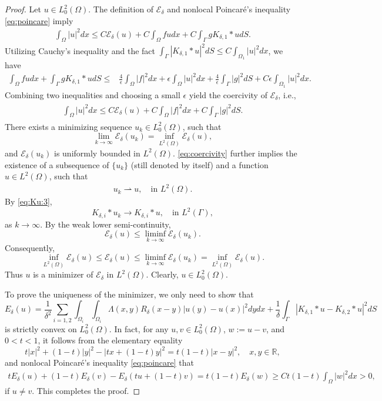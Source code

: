 \documentclass{article}
\newcommand{\R}{\mathbb{R}}
\theoremstyle{definition}
\begin{document}
\begin{proof}
  Let $u\in L^2_0(\Omega)$.
  The definition of $\mathcal{E}_\delta$ and nonlocal Poincar\'{e}'s inequality \eqref{eq:poincare} imply
  \begin{align*}
    \int_\Omega |u|^2dx
    \leq C\mathcal{E}_\delta(u)
    +C\int_{\Omega}fudx + C\int_\Gamma g K_{\delta,1}\ast u dS.
  \end{align*}
  Utilizing Cauchy's inequality and the fact
  $\int_\Gamma |K_{\delta,1}\ast u|^2dS\leq C\int_{\Omega_1}|u|^2dx$,
  we have
  \begin{align*}
  \int_{\Omega}fudx + \int_\Gamma gK_{\delta,1}\ast u dS
  \leq& \frac{4}{\epsilon}\int_\Omega |f|^2dx
  +\epsilon\int_\Omega |u|^2dx
  +\frac{4}{\epsilon}\int_\Gamma |g|^2dS
  +C\epsilon \int_{\Omega_1}|u|^2dx.
  \end{align*}
  Combining two inequalities and choosing a small $\epsilon$ yield the coercivity of $\mathcal{E}_\delta$, i.e.,
    \begin{align}\label{eq:coercivity}
  \begin{split}
    \int_\Omega|u|^2dx
    \leq C\mathcal{E}_\delta(u)+C\int_\Omega |f|^2dx + C\int_\Gamma |g|^2dS.
  \end{split}
  \end{align}
There exists a minimizing sequence $u_k\in L_0^2(\Omega)$, such that
\[
\lim_{k\rightarrow\infty}\mathcal{E}_\delta(u_k)=\inf_{L^2(\Omega)} \mathcal{E}_\delta(u),
\]
and $\mathcal{E}_\delta(u_k)$ is uniformly bounded in $L^2(\Omega)$.
\eqref{eq:coercivity} further implies the existence of a subsequence of $\{u_k\}$ (still denoted by itself) and a function $u\in L^2(\Omega)$, such that
\begin{align*}
  u_{k} \rightharpoonup {u}, \quad \mbox{in } L^2(\Omega).
\end{align*}
By \eqref{eq:Ku:3},
  \[
  K_{\delta,i}\ast u_k\rightarrow K_{\delta,i}\ast u, \quad \mbox{in } L^2(\Gamma),
  \]
  as $k\rightarrow \infty$.
 By the weak lower semi-continuity,
\[
\mathcal{E}_\delta(u)
\leq \liminf_{k\rightarrow\infty}\mathcal{E}_\delta(u_k).
\]
Consequently,
\[
\inf_{L^2(\Omega)} \mathcal{E}_\delta(u)
\leq \mathcal{E}_\delta(u)
\leq \liminf_{k\rightarrow\infty}\mathcal{E}_\delta(u_k)
=\inf_{L^2(\Omega)} \mathcal{E}_\delta(u).
\]
Thus $u$ is a minimizer of $\mathcal{E}_\delta$ in $L^2(\Omega)$.
Clearly, $u\in L^2_0(\Omega)$.

To prove the uniqueness of the minimizer, we only need to show that
\[
E_\delta(u)=
\frac{1}{\delta^2}\sum_{i=1,2}\int_{\Omega_i}\int_{\Omega_i}\Lambda(x,y) R_\delta(x-y)|u(y)-u(x)|^2dydx
+\frac{1}{\delta}
\int_\Gamma\left|K_{\delta,1}\ast u-K_{\delta,2}\ast u\right|^2dS
\]
is strictly convex on $L^2_0(\Omega)$.
In fact, for any $u,v\in L^2_0(\Omega)$, $w:=u-v$, and $0<t<1$,
it follows from the elementary equality
\[
t|x|^2+(1-t)|y|^2-|tx+(1-t)y|^2=t(1-t)|x-y|^2,\quad x,y\in\R,
\]
and nonlocal Poincar\'{e}'s inequality \eqref{eq:poincare}
that
\begin{align*}
tE_\delta(u)+(1-t)E_\delta(v)-E_\delta(tu+(1-t)v)
=t(1-t)E_\delta(w)
\geq Ct(1-t)\int_\Omega |w|^2dx>0,
\end{align*}
if $u\neq v$.
This completes the proof.
\end{proof}
\end{document}
